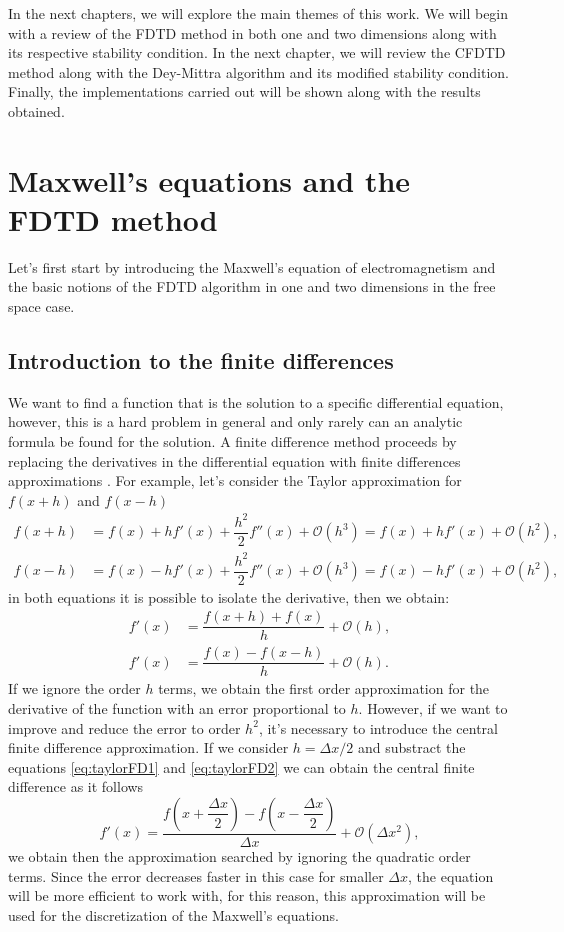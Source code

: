 \documentclass[12pt, oneside]{book}
\begin{document}
In the next chapters, we will explore the main themes of this work. We will begin with a review of the FDTD method in both one and two dimensions along with its respective stability condition. In the next chapter, we will review the CFDTD method along with the Dey-Mittra algorithm and its modified stability condition. Finally, the implementations carried out will be shown along with the results obtained.

\chapter{Maxwell's equations and the FDTD method}

Let's first start by introducing the Maxwell's equation of electromagnetism and the basic notions of the FDTD algorithm in one and two dimensions in the free space case.

\section{Introduction to the finite differences}

We want to find a function that is the solution to a specific differential equation, however, this is a hard problem in general and only rarely can an analytic formula be found for the solution. A finite difference method proceeds by replacing the derivatives in the differential equation with finite differences approximations \cite{LeVeque,Burden-2016}. For example, let's consider the Taylor approximation for $f(x+h)$ and $f(x-h)$
\begin{align}
    f(x+h) &= f(x) + h  f'(x) + \dfrac{h^2}{2}f''(x) + \mathcal{O}(h^3) = f(x) + h  f'(x) + \mathcal{O}(h^2), \label{eq:taylorFD1}\\
    f(x-h) &= f(x) - h  f'(x) + \dfrac{h^2}{2}f''(x) + \mathcal{O}(h^3) = f(x) - h  f'(x) + \mathcal{O}(h^2),
    \label{eq:taylorFD2}
\end{align}
in both equations it is possible to isolate the derivative, then we obtain:
\begin{align}
    f'(x) &= \dfrac{f(x+h)+f(x)}{h} + \mathcal{O}(h), \\
    f'(x) &= \dfrac{f(x)-f(x-h)}{h} + \mathcal{O}(h).
\end{align}
If we ignore the order $h$ terms, we obtain the first order approximation for the derivative of the function with an error proportional to $h$. However, if we want to improve and reduce the error to order $h^2$, it's necessary to introduce the central finite difference approximation. If we consider $h=\Delta x/2$ and substract the equations \ref{eq:taylorFD1} and \ref{eq:taylorFD2} we can obtain the central finite difference as it follows
\begin{equation}
    f'(x) = \dfrac{f\left( x+ \dfrac{\Delta x}{2} \right) - f\left( x - \dfrac{\Delta x}{2} \right)}{\Delta x} + \mathcal{O}(\Delta x^2),
\end{equation}
we obtain then the approximation searched by ignoring the quadratic order terms. Since the error decreases faster in this case for smaller $\Delta x$, the equation will be more efficient to work with, for this reason, this approximation will be used for the discretization of the Maxwell's equations.
\end{document}
